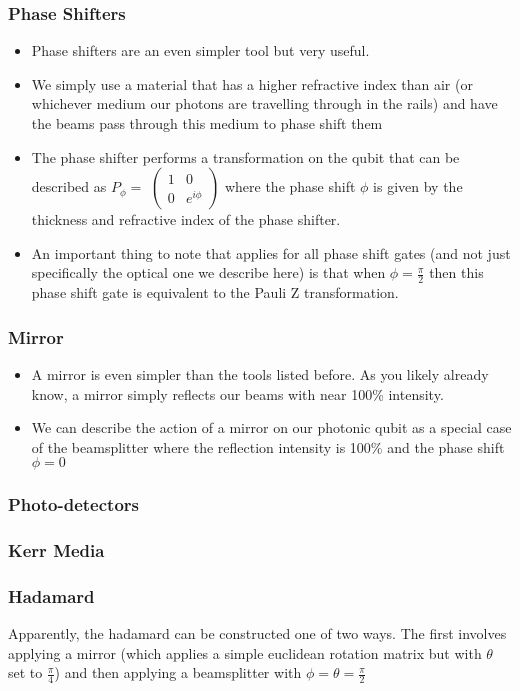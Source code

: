 \subsubsection{Phase Shifters}
\begin{itemize}
    \item Phase shifters are an even simpler tool but very useful. 
    \item We simply use a material that has a higher refractive index than air (or whichever medium our photons are travelling through in the rails) and have the beams pass through this medium to phase shift them
    \item The phase shifter performs a transformation on the qubit that can be described as $P_\phi = $ $\begin{pmatrix}
    1 & 0 \\
    0 & e^{i\phi}
    \end{pmatrix}$ where the phase shift $\phi$ is given by the thickness and refractive index of the phase shifter.
    \item An important thing to note that applies for all phase shift gates (and not just specifically the optical one we describe here) is that when $\phi = \frac{\pi}{2}$ then this phase shift gate is equivalent to the Pauli Z transformation.
\end{itemize}
\subsubsection{Mirror}
\begin{itemize}
    \item A mirror is even simpler than the tools listed before. As you likely already know, a mirror simply reflects our beams with near 100\% intensity.
    \item We can describe the action of a mirror on our photonic qubit as a special case of the beamsplitter where the reflection intensity is 100\% and the phase shift $\phi = 0$
\end{itemize}
\subsubsection{Photo-detectors}
\subsubsection{Kerr Media}
\subsubsection{Hadamard}
Apparently, the hadamard can be constructed one of two ways. The first involves applying a mirror (which applies a simple euclidean rotation matrix but with $\theta$ set to $\frac{\pi}{4}$) and then applying a beamsplitter with $\phi = \theta = \frac{\pi}{2}$ 

